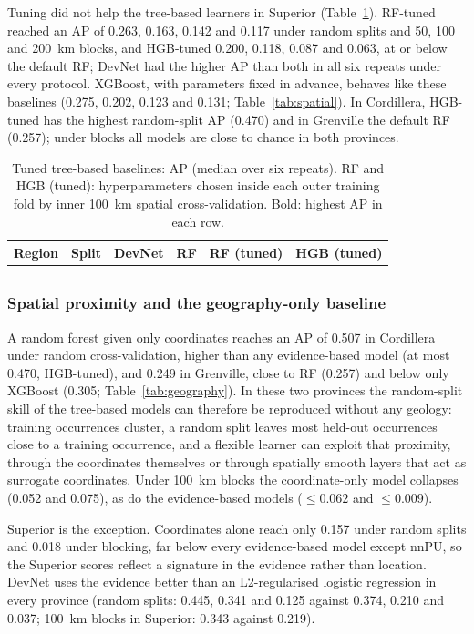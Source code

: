 \documentclass[pdflatex,sn-apa]{sn-jnl}
\begin{document}
Tuning did not help the tree-based learners in Superior (Table~\ref{tab:controls}). RF-tuned reached an AP of 0.263, 0.163, 0.142 and 0.117 under random splits and 50, 100 and 200~km blocks, and HGB-tuned 0.200, 0.118, 0.087 and 0.063, at or below the default RF; DevNet had the higher AP than both in all six repeats under every protocol. XGBoost, with parameters fixed in advance, behaves like these baselines (0.275, 0.202, 0.123 and 0.131; Table~\ref{tab:spatial}). In Cordillera, HGB-tuned has the highest random-split AP (0.470) and in Grenville the default RF (0.257); under blocks all models are close to chance in both provinces.

\begin{table}[t]
\caption{Tuned tree-based baselines: AP (median over six repeats). RF and HGB (tuned): hyperparameters chosen inside each outer training fold by inner 100~km spatial cross-validation. Bold: highest AP in each row.}\label{tab:controls}
\footnotesize
\setlength{\tabcolsep}{3pt}
\begin{tabular*}{\textwidth}{@{\extracolsep\fill}llcccc}
\toprule
Region & Split & DevNet & RF & RF (tuned) & HGB (tuned) \\
\midrule
\botrule
\end{tabular*}
\end{table}

\subsubsection{Spatial proximity and the geography-only baseline}\label{sec:res-geography}

A random forest given only coordinates reaches an AP of 0.507 in Cordillera under random cross-validation, higher than any evidence-based model (at most 0.470, HGB-tuned), and 0.249 in Grenville, close to RF (0.257) and below only XGBoost (0.305; Table~\ref{tab:geography}). In these two provinces the random-split skill of the tree-based models can therefore be reproduced without any geology: training occurrences cluster, a random split leaves most held-out occurrences close to a training occurrence, and a flexible learner can exploit that proximity, through the coordinates themselves or through spatially smooth layers that act as surrogate coordinates. Under 100~km blocks the coordinate-only model collapses (0.052 and 0.075), as do the evidence-based models ($\leq 0.062$ and $\leq 0.009$).

Superior is the exception. Coordinates alone reach only 0.157 under random splits and 0.018 under blocking, far below every evidence-based model except nnPU, so the Superior scores reflect a signature in the evidence rather than location. DevNet uses the evidence better than an L2-regularised logistic regression in every province (random splits: 0.445, 0.341 and 0.125 against 0.374, 0.210 and 0.037; 100~km blocks in Superior: 0.343 against 0.219).
\end{document}
